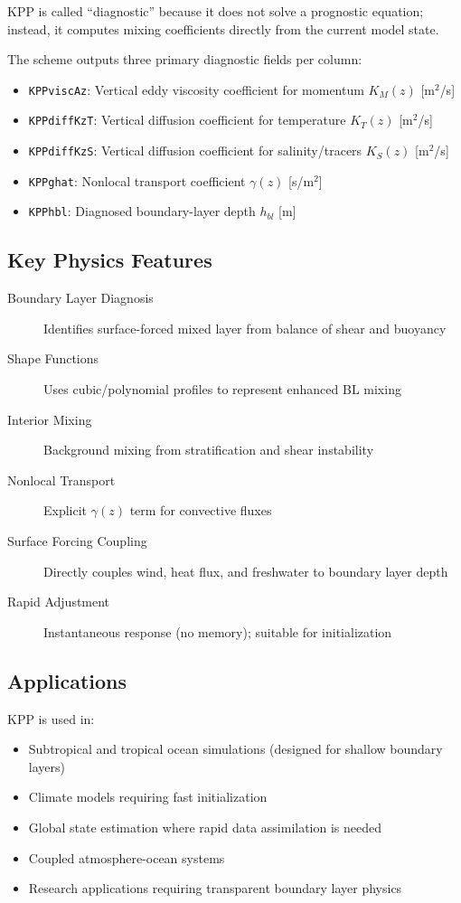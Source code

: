 \documentclass[11pt, a4paper]{article}
\begin{document}
KPP is called ``diagnostic'' because it does not solve a prognostic equation; instead, it computes mixing coefficients directly from the current model state.

The scheme outputs three primary diagnostic fields per column:

\begin{itemize}
    \item \texttt{KPPviscAz}: Vertical eddy viscosity coefficient for momentum $K_M(z)$ [m$^2$/s]
    \item \texttt{KPPdiffKzT}: Vertical diffusion coefficient for temperature $K_T(z)$ [m$^2$/s]
    \item \texttt{KPPdiffKzS}: Vertical diffusion coefficient for salinity/tracers $K_S(z)$ [m$^2$/s]
    \item \texttt{KPPghat}: Nonlocal transport coefficient $\gamma(z)$ [s/m$^2$]
    \item \texttt{KPPhbl}: Diagnosed boundary-layer depth $h_{bl}$ [m]
\end{itemize}

\subsection{Key Physics Features}

\begin{description}
    \item[Boundary Layer Diagnosis] Identifies surface-forced mixed layer from balance of shear and buoyancy
    \item[Shape Functions] Uses cubic/polynomial profiles to represent enhanced BL mixing
    \item[Interior Mixing] Background mixing from stratification and shear instability
    \item[Nonlocal Transport] Explicit $\gamma(z)$ term for convective fluxes
    \item[Surface Forcing Coupling] Directly couples wind, heat flux, and freshwater to boundary layer depth
    \item[Rapid Adjustment] Instantaneous response (no memory); suitable for initialization
\end{description}

\subsection{Applications}

KPP is used in:

\begin{itemize}
    \item Subtropical and tropical ocean simulations (designed for shallow boundary layers)
    \item Climate models requiring fast initialization
    \item Global state estimation where rapid data assimilation is needed
    \item Coupled atmosphere-ocean systems
    \item Research applications requiring transparent boundary layer physics
\end{itemize}
\end{document}
